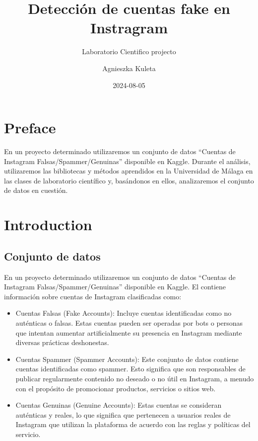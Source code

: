 \documentclass[
  letterpaper,
  DIV=11,
  numbers=noendperiod]{scrreprt}
\title{Detección de cuentas fake en Instragram}
\subtitle{Laboratorio Cientifico projecto}
\author{Agnieszka Kuleta}
\date{2024-08-05}
\providecommand{\tightlist}{%
  \setlength{\itemsep}{0pt}\setlength{\parskip}{0pt}}\usepackage{longtable,booktabs,array}
\renewcommand*\contentsname{Table of contents}
\newcommand\contentsname{Table of contents}
\begin{document}
\maketitle
\ifdefined\Shaded\renewenvironment{Shaded}{\begin{tcolorbox}[frame hidden, sharp corners, interior hidden, borderline west={3pt}{0pt}{shadecolor}, breakable, boxrule=0pt, enhanced]}{\end{tcolorbox}}\fi

\renewcommand*\contentsname{Table of contents}
{
\hypersetup{linkcolor=}
\setcounter{tocdepth}{2}
\tableofcontents
}

\hypertarget{preface}{%
\chapter*{Preface}\label{preface}}


En un proyecto determinado utilizaremos un conjunto de datos ``Cuentas
de Instagram Falsas/Spammer/Genuinas'' disponible en Kaggle. Durante el
análisis, utilizaremos las bibliotecas y métodos aprendidos en la
Universidad de Málaga en las clases de laboratorio científico y,
basándonos en ellos, analizaremos el conjunto de datos en cuestión.


\hypertarget{introduction}{%
\chapter{Introduction}\label{introduction}}

\hypertarget{conjunto-de-datos}{%
\section{Conjunto de datos}\label{conjunto-de-datos}}

En un proyecto determinado utilizaremos un conjunto de datos ``Cuentas
de Instagram Falsas/Spammer/Genuinas'' disponible en Kaggle. El contiene
información sobre cuentas de Instagram clasificadas como:

\begin{itemize}
\tightlist
\item
  Cuentas Falsas (Fake Accounts): Incluye cuentas identificadas como no
  auténticas o falsas. Estas cuentas pueden ser operadas por bots o
  personas que intentan aumentar artificialmente su presencia en
  Instagram mediante diversas prácticas deshonestas.
\item
  Cuentas Spammer (Spammer Accounts): Este conjunto de datos contiene
  cuentas identificadas como spammer. Esto significa que son
  responsables de publicar regularmente contenido no deseado o no útil
  en Instagram, a menudo con el propósito de promocionar productos,
  servicios o sitios web.
\item
  Cuentas Genuinas (Genuine Accounts): Estas cuentas se consideran
  auténticas y reales, lo que significa que pertenecen a usuarios reales
  de Instagram que utilizan la plataforma de acuerdo con las reglas y
  políticas del servicio.
\end{itemize}
\end{document}
